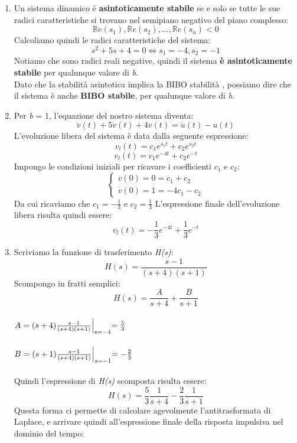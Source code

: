 \documentclass[12pt,a4paper]{article}
\begin{document}
   	\begin{enumerate}
   	\item Un sistema dinamico \'e \textbf{asintoticamente stabile} se e solo se tutte le sue radici caratteristiche si trovano nel semipiano negativo del piano complesso:
   	\[
   		\mathbb{R}e(s_1), \mathbb{R}e(s_2), ... , \mathbb{R}e(s_n) < 0
   	\]
   	Calcoliamo quindi le radici caratteristiche del sistema:
   	\[
   		s^2 + 5s + 4 = 0
   		\Longleftrightarrow
   		s_1 = -4, s_2 = -1
   	\]
   	Notiamo che sono radici reali negative, quindi il sistema\textbf{ è asintoticamente stabile} per qualunque valore di \textit{b}.\\
   	Dato che la stabilità asintotica implica la BIBO stabilità , possiamo dire che il sistema è anche \textbf{ BIBO stabile}, per qualunque valore di \textit{b}.
   	\item Per \textit{b} = 1, l'equazione del nostro sistema diventa:
   	\[
   	\ddot{v}(t) + 5\dot{v}(t) + 4v(t) = \dot{u}(t) - u(t)
   	\]
   	L'evoluzione libera del sistema è data dalla seguente espressione:
   	\[
   		v_l(t) = c_1e^{s_1t} + c_2e^{s_2t}
   	\]
   	\[
   		v_l(t) = c_1e^{-4t} + c_2e^{-t}
   	\]
   	Impongo le condizioni iniziali per ricavare i coefficienti $c_1$ e $c_2$:
	\[
   		\begin{cases}
   		v(0) = 0 = c_1 + c_2 \\
   		\dot{v}(0) = 1 = -4c_1 - c_2
   		\end{cases}
   	\]
   	Da cui ricaviamo che $c_1 = -\frac{1}{3}$ e $c_2 = \frac{1}{3}$
   	L'espressione finale dell'evoluzione libera risulta quindi essere:
   	\[
   		v_l(t) = -\frac{1}{3}e^{-4t} + \frac{1}{3}e^{-t}
   	\]
   	\item Scriviamo la funzione di trasferimento \textit{H(s)}:
   	\[
   		H(s) = \frac{s-1}{(s+4)(s+1)}
   	\]
   	Scompongo in fratti semplici:
   	\[
   	H(s) = \frac{A}{s+4} + \frac{B}{s+1}
   	\] \\
   	$ A = (s+4) \frac{s-1}{(s+4)(s+1)}\Bigl\vert_{s=-4} = \frac{5}{3} $ \\ \\
	$ B = (s+1) \frac{s-1}{(s+4)(s+1)}\Bigl\vert_{s=-1} = -\frac{2}{3} $ \\ \\
	Quindi l'espressione di \textit{H(s)} scomposta risulta essere:
	\[
		H(s) = \frac{5}{3}\frac{1}{s+4} -\frac{2}{3}\frac{1}{s+1}
	\]
   	Questa forma ci permette di calcolare agevolmente l'antitrasformata di Laplace, e arrivare quindi all'espressione finale della risposta impulsiva nel dominio del tempo:

\end{enumerate}
\end{document}
